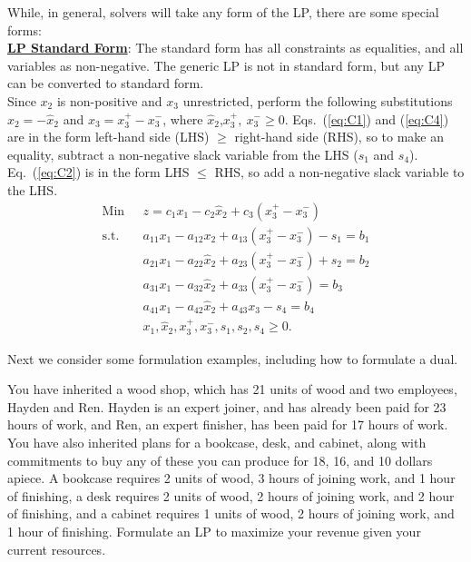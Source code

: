 While, in general, solvers will take any form of the LP, there are some special forms:\\

\medskip \underline{\bf LP Standard Form}: The standard form has all constraints as equalities, and all variables as non-negative.  The generic LP is not in standard form, but any LP can be converted to standard form. \\

Since $x_2$ is non-positive and $x_3$ unrestricted, perform the following substitutions $x_2=-\hat{x}_2$ and $x_3 = x_3^+ -x_3^-$, where $\hat{x}_2$,$x_3^+,~x_3^- \ge 0$.   Eqs.~(\ref{eq:C1}) and (\ref{eq:C4}) are in the form left-hand side (LHS) $\ge$ right-hand side (RHS), so to make an equality, subtract a non-negative slack variable from the LHS ($s_1$ and $s_4$).  Eq.~(\ref{eq:C2}) is in the form LHS $\le$ RHS, so add a non-negative slack variable to the LHS.
\begin{align*}
\mbox{Min~~} & z = c_1x_1 - c_2\hat{x}_2 + c_3 (x_3^+ -x_3^-)  \\
\mbox{s.t.~~} & a_{11}x_1 - a_{12}x_2 + a_{13} (x_3^+ -x_3^-) - s_1 = b_1 \\
& a_{21}x_1 - a_{22}\hat{x}_2 + a_{23} (x_3^+ -x_3^-) + s_2 = b_2 \\
&  a_{31}x_1 - a_{32}\hat{x}_2 + a_{33} (x_3^+ -x_3^-) = b_3 \\
& a_{41}x_1 - a_{42}\hat{x}_2 + a_{43} x_3 - s_4 = b_4 \\
& x_1, \hat{x}_2, x_3^+, x_3^-, s_1, s_2, s_4 \ge 0.
\end{align*}


Next we consider some formulation examples, including how to formulate a dual.

 You have inherited a wood shop, which has 21 units of wood and two employees, Hayden and Ren.  Hayden is an expert joiner, and has already been paid for 23 hours of work, and Ren, an expert finisher, has been paid for 17 hours of work. You have also inherited plans for a bookcase, desk, and cabinet, along with commitments to buy any of these you can produce for 18, 16, and 10 dollars apiece.  A bookcase requires 2 units of wood, 3 hours of joining work, and 1 hour of finishing, a desk requires 2 units of wood, 2 hours of joining work, and 2 hour of finishing, and a cabinet requires 1 units of wood, 2 hours of joining work, and 1 hour of finishing. Formulate an LP to maximize your revenue given your current resources.

